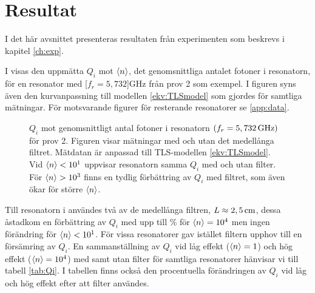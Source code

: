 \documentclass[main.tex]{subfiles}
\begin{document}
\chapter{Resultat}
\label{sec:results}
I det här avsnittet presenteras resultaten från experimenten som beskrevs i kapitel \ref{ch:exp}. 

 
I  visas den uppmätta $Q_i$ mot $\expval{n}$, det genomsnittliga antalet fotoner i resonatorn, för en resonator med \unit[$f_r=5,732$]{GHz} från prov 2 som exempel. I figuren syns även den kurvanpassning till modellen \eqref{ekv:TLSmodel} som gjordes för samtliga mätningar. För motsvarande figurer för resterande resonatorer se \ref{app:data}.%

\begin{figure}[H]
  \centering
  \setlength{}
  \setlength\figureheight{9em}
  
  \caption{$Q_i$ mot genomsnittligt antal fotoner i resonatorn $(f_r=\unit[5,732]{GHz})$ för prov 2. Figuren visar mätningar med och utan det medellånga filtret. Mätdatan är anpassad till TLS-modellen \eqref{ekv:TLSmodel}. Vid $\expval{n}<10^1$ uppvisar resonatorn samma $Q_i$ med och utan filter. För $\expval{n}>10^3$ finns en tydlig förbättring av $Q_i$ med filtret, som även ökar för större $\expval{n}$.}
  \label{fig:Qi_n}
\end{figure}


Till resonatorn i  användes två av de medellånga filtren, $L\approx \unit[2,5]{cm}$, dessa åstadkom en förbättring av $Q_i$ med upp till \unit[46]{\%} för $\expval{n}=10^4$ men ingen förändring för $\expval{n}<10^1$. För vissa resonatorer gav istället filtern upphov till en försämring av $Q_i$. En sammanställning av $Q_i$ vid låg effekt ($\expval{n}=1$) och hög effekt ($\expval{n}=10^4$) med samt utan filter för samtliga resonatorer hänvisar vi till tabell \ref{tab:Qi}. I tabellen finns också den procentuella förändringen av $Q_i$ vid låg och hög effekt efter att filter användes.
\end{document}
